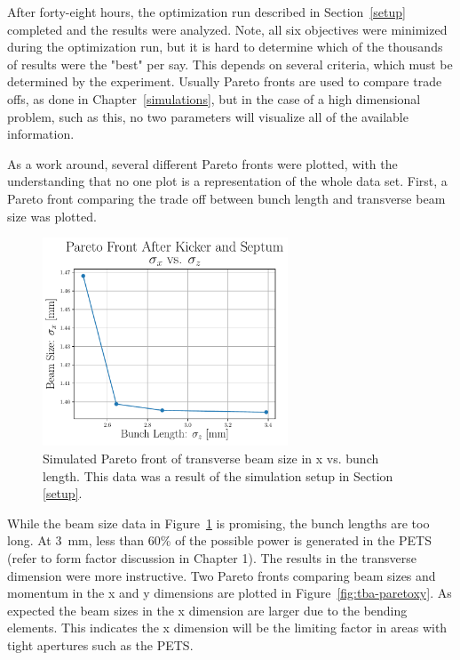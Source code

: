 After forty-eight hours, the optimization run described in Section~\ref{setup} completed and the results were analyzed. 
Note, all six objectives were minimized during the optimization run, but it is hard to determine which 
of the thousands of results were the "best" per say. This depends on several criteria, which must be 
determined by the experiment. Usually Pareto fronts are used to compare trade offs,
as done in Chapter~\ref{simulations}, but in the case of a high dimensional problem, such as this, 
no two parameters will visualize all of the available information.

As a work around, several different Pareto fronts were plotted, with the understanding that 
no one plot is a representation of the whole data set.
First, a Pareto front comparing the trade off between bunch length and transverse beam size was plotted.  
\begin{figure}
	\centering
	\includegraphics[width=0.65\textwidth]{images/x_vs_z_pareto_front_Q5}
	\caption{Simulated Pareto front of transverse beam size in x vs. bunch length.
		This data was a result of the simulation setup in Section \ref{setup}.}
	\label{fig:xz-pareto}
\end{figure}
While the beam size data in Figure~\ref{fig:xz-pareto} is promising, the bunch lengths are too long.
At \SI{3}{mm}, less than 60\% of the possible power is generated in the PETS (refer to form factor discussion in Chapter 1). 
The results in the transverse dimension were
more instructive. Two Pareto fronts comparing beam sizes
and momentum in the x and y dimensions are plotted in Figure~\ref{fig:tba-paretoxy}.
As expected the beam sizes in the x dimension are larger 
due to the bending elements. This indicates the x dimension will be the 
limiting factor in areas with tight apertures such as the PETS.  
